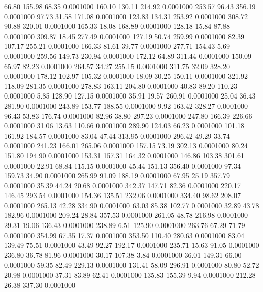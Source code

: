   66.80  155.98   68.35   0.0001000
 160.10  130.11  214.92   0.0001000
 253.57   96.43  356.19   0.0001000
  97.73   31.58  171.08   0.0001000
 123.83  134.31  253.92   0.0001000
 308.72   90.88  320.01   0.0001000
 165.33   18.08  168.89   0.0001000
 128.18   15.84   87.88   0.0001000
 309.87   18.45  277.49   0.0001000
 127.19   50.74  259.99   0.0001000
  82.39  107.17  255.21   0.0001000
 166.33   81.61   39.77   0.0001000
 277.71  154.43    5.69   0.0001000
 259.56  149.73  230.94   0.0001000
 172.12   64.89  311.44   0.0001000
 150.09   65.97   82.23   0.0001000
 264.57   34.27  255.15   0.0001000
 311.75   32.09  328.20   0.0001000
 178.12  102.97  105.32   0.0001000
  18.09   30.25  150.11   0.0001000
 321.92  118.09  281.35   0.0001000
 278.83  163.11  204.80   0.0001000
  40.83   89.20  110.23   0.0001000
   5.85  128.90  127.15   0.0001000
  35.91   19.57  260.91   0.0001000
  25.04   36.43  281.90   0.0001000
 243.89  153.77  188.55   0.0001000
   9.92  163.42  328.27   0.0001000
  96.43   53.83  176.74   0.0001000
  82.96   38.80  297.23   0.0001000
 247.80  166.39  226.66   0.0001000
  31.06   13.63  110.66   0.0001000
 289.90  124.03   66.23   0.0001000
 101.18  161.92  184.57   0.0001000
  83.04   47.44  313.95   0.0001000
 296.42   49.29   33.74   0.0001000
 241.23  166.01  265.06   0.0001000
 157.15   73.19  302.13   0.0001000
  80.24  151.80  194.90   0.0001000
 153.31  157.31  164.32   0.0001000
 146.86  103.38  301.61   0.0001000
  22.91   68.84  115.15   0.0001000
  45.44  151.13  356.40   0.0001000
  97.34  159.73   34.90   0.0001000
 265.99   91.09  188.19   0.0001000
  67.95   25.19  357.79   0.0001000
  35.39   44.24   20.68   0.0001000
 342.37  147.71   82.36   0.0001000
 220.17  146.45  293.54   0.0001000
 154.36  135.51  232.06   0.0001000
 334.40   98.62  208.07   0.0001000
 265.13   42.28  334.90   0.0001000
  63.03   85.38  102.77   0.0001000
  32.89   43.78  182.96   0.0001000
 209.24   28.84  357.53   0.0001000
 261.05   48.78  216.98   0.0001000
  29.31   19.06  136.43   0.0001000
 238.89    6.51  125.90   0.0001000
 263.76   67.29   71.79   0.0001000
 354.99   67.35   17.37   0.0001000
 353.50  110.40  280.63   0.0001000
  83.04  139.49   75.51   0.0001000
  43.49   92.27  192.17   0.0001000
 235.71   15.63   91.05   0.0001000
 236.80   36.78   81.96   0.0001000
  30.17  107.38    3.84   0.0001000
  36.01  149.31   66.00   0.0001000
  59.35   82.49  229.13   0.0001000
 131.41   58.09  296.91   0.0001000
  80.80   52.72   20.98   0.0001000
  37.31   83.89   62.41   0.0001000
 135.83  155.39    9.94   0.0001000
 212.28   26.38  337.30   0.0001000
